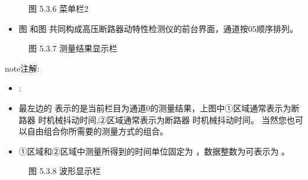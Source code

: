 \documentclass[a4paper,10pt,english]{sphinxmanual}
\begin{document}
\begin{figure}[htbp]
\centering
\capstart

\noindent{}
\caption{图 5.3.6 菜单栏2}\label{\detokenize{operation_guide:id14}}\end{figure}
\begin{itemize}
\item {} 
\sphinxAtStartPar
图  和图  共同构成高压断路器动特性检测仪的前台界面，通道按0\sphinxhyphen{}5顺序排列。

\end{itemize}

\begin{figure}[htbp]
\centering
\capstart

\noindent{}
\caption{图 5.3.7 测量结果显示栏}\label{\detokenize{operation_guide:id15}}\end{figure}

\begin{sphinxadmonition}{note}{注解:}\begin{itemize}
\item {} 
\sphinxAtStartPar
{} :

\item {} 
\sphinxAtStartPar
最左边的  表示的是当前栏目为通道0的测量结果，上图中①区域通常表示为断路器  时机械抖动时间,②区域通常表示为断路器  时机械抖动时间。
当然您也可以自由组合你所需要的测量方式的组合。

\item {} 
\sphinxAtStartPar
①区域和②区域中测量所得到的时间单位固定为 ，数据整数为可表示为 。

\end{itemize}
\end{sphinxadmonition}

\begin{figure}[htbp]
\centering
\capstart

\noindent{}
\caption{图 5.3.8 波形显示栏}\label{\detokenize{operation_guide:id16}}\end{figure}
\end{document}

